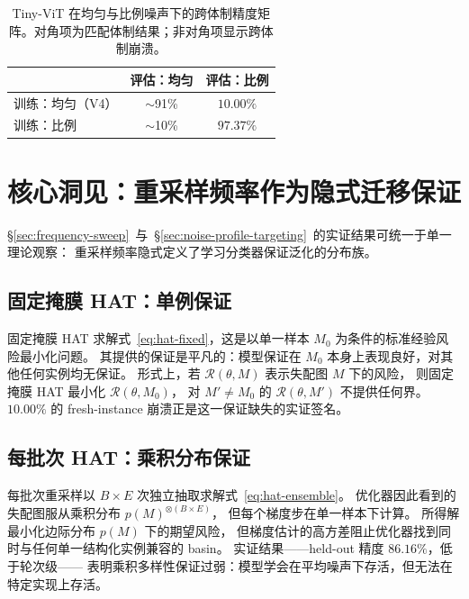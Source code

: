 \begin{table}[t]
    \centering
    \caption{Tiny-ViT 在均匀与比例噪声下的跨体制精度矩阵。对角项为匹配体制结果；非对角项显示跨体制崩溃。}
    \label{tab:noise-regime-matrix}
    \small
    \begin{tabular}{lcc}
        \toprule
        & \textbf{评估：均匀} & \textbf{评估：比例} \\
        \midrule
        训练：均匀（V4） & $\sim$91\% & $10.00\%$ \\
        训练：比例 & $\sim$10\% & $97.37\%$ \\
        \bottomrule
    \end{tabular}
\end{table}

\section{核心洞见：重采样频率作为隐式迁移保证}
\label{sec:cadence-transfer-guarantee}

\S\ref{sec:frequency-sweep}~与~\S\ref{sec:noise-profile-targeting}~的实证结果可统一于单一理论观察：
重采样频率隐式定义了学习分类器保证泛化的分布族。

\subsection{固定掩膜 HAT：单例保证}

固定掩膜 HAT 求解式~\ref{eq:hat-fixed}，这是以单一样本 $M_{0}$ 为条件的标准经验风险最小化问题。
其提供的保证是平凡的：模型保证在 $M_0$ 本身上表现良好，对其他任何实例均无保证。
形式上，若 $\mathcal{R}(\theta,M)$ 表示失配图 $M$ 下的风险，
则固定掩膜 HAT 最小化 $\mathcal{R}(\theta,M_{0})$，
对 $M'\neq M_{0}$ 的 $\mathcal{R}(\theta,M')$ 不提供任何界。
$10.00\%$ 的 fresh-instance 崩溃正是这一保证缺失的实证签名。

\subsection{每批次 HAT：乘积分布保证}

每批次重采样以 $B\times E$ 次独立抽取求解式~\ref{eq:hat-ensemble}。
优化器因此看到的失配图服从乘积分布 $p(M)^{\otimes(B\times E)}$，
但每个梯度步在单一样本下计算。
所得解最小化边际分布 $p(M)$ 下的期望风险，
但梯度估计的高方差阻止优化器找到同时与任何单一结构化实例兼容的 basin。
实证结果——held-out 精度 $86.16\%$，低于轮次级——
表明乘积多样性保证过弱：模型学会在平均噪声下存活，但无法在特定实现上存活。

